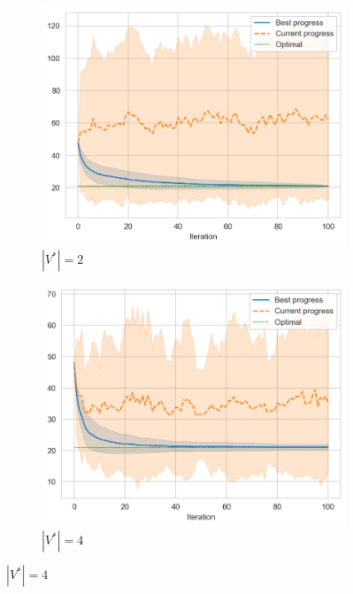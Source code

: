 \begin{figure}[ht]
    \centering
    \hfill
    \begin{subfigure}{0.45\textwidth}
        \centering
        \includegraphics[width=\textwidth]{../images/p1/added32s.png}
        \caption{\(|V^*| = 2\)}
    \end{subfigure}
    \hfill
    \begin{subfigure}{0.45\textwidth}
        \centering
        \includegraphics[width=\textwidth]{../images/p1/added34s.png}
        \caption{\(|V^*| = 4\)}
    \end{subfigure}
    \hfill



\end{figure}
